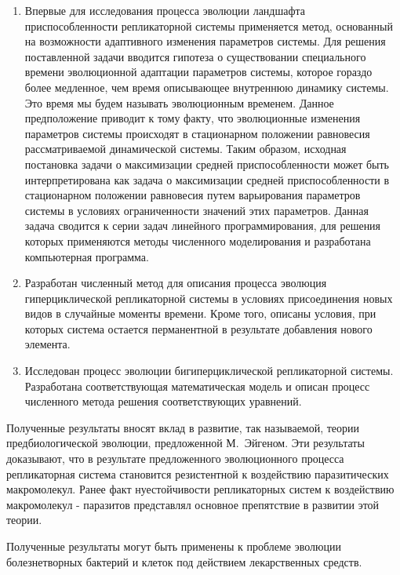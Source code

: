 {\novelty}
\begin{enumerate}
  \item Впервые для исследования процесса эволюции ландшафта приспособленности репликаторной системы применяется метод, основанный на возможности адаптивного изменения параметров системы. Для решения поставленной задачи вводится гипотеза о существовании специального времени эволюционной адаптации параметров системы, которое гораздо более медленное, чем время описывающее внутреннюю динамику системы. Это время мы будем называть эволюционным временем. Данное предположение приводит к тому факту, что эволюционные изменения параметров системы происходят в стационарном положении равновесия рассматриваемой динамической системы. Таким образом, исходная постановка задачи о максимизации средней приспособленности может быть интерпретирована как задача о максимизации средней приспособленности в стационарном положении равновесия путем варьирования параметров системы в условиях ограниченности значений этих параметров. Данная задача сводится к серии задач линейного программирования, для решения которых применяются методы численного моделирования и разработана компьютерная программа.
  
  \item Разработан численный метод для описания процесса эволюция гиперциклической репликаторной системы в условиях присоединения новых видов в случайные моменты времени. Кроме того, описаны условия, при которых система остается перманентной в результате добавления нового элемента.  
   
  \item Исследован процесс эволюции бигиперциклической репликаторной системы. Разработана соответствующая математическая модель и описан процесс численного метода решения соответствующих уравнений.
\end{enumerate}


{\theoryInfluence}
Полученные результаты вносят вклад в развитие, так называемой, теории предбиологической эволюции, предложенной М.~Эйгеном. Эти результаты доказывают, что в результате предложенного эволюционного процесса репликаторная система становится резистентной к воздействию паразитических макромолекул. Ранее факт нуестойчивости репликаторных систем к воздействию макромолекул - паразитов представлял основное препятствие в развитии этой теории.


{\influence}
Полученные результаты могут быть применены к проблеме эволюции болезнетворных бактерий и клеток под действием лекарственных средств.


